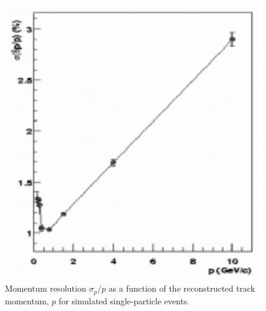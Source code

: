 \begin{figure}[!h]
\begin{center}
\includegraphics[width=0.45\linewidth]{figs/dc_mom_res.png}
\caption{Momentum resolution $\sigma_{p}/p$ as a function of the reconstructed track momentum, $p$ for simulated single-particle events\cite{CA_spectro}.}
\label{fig:dc_mom_res}
\end{center}
\end{figure}

